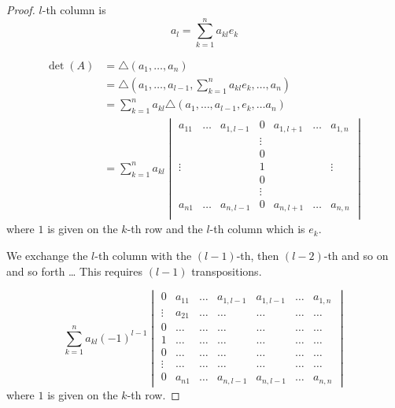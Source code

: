 \documentclass[a4paper,landscape,twocolumn]{article}
\theoremstyle{definition}
\begin{document}
\begin{proof}
  $l$-th column is
  \[ a_l = \sum_{k=1}^n a_{kl} e_{k} \]

  \begin{align*}
    \det(A) &= \triangle(a_1, \ldots, a_n) \\
      &= \triangle (a_1, \ldots, a_{l-1}, \sum_{k=1}^n a_{kl} e_k, \ldots, a_n) \\
      &= \sum_{k=1}^n a_{kl} \triangle (a_1, \ldots, a_{l-1}, e_k, \ldots a_n) \\
      &= \sum_{k=1}^n a_{kl}
        \begin{vmatrix}
          a_{11} & \ldots & a_{1,l-1} & 0 & a_{1,l+1} & \ldots & a_{1,n} \\
                 &        &           & \vdots &      &        & \\
                 &        &           & 0      &      &        & \\
          \vdots &        &           & 1      &      &        & \vdots \\
                 &        &           & 0      &      &        & \\
                 &        &           & \vdots &      &        & \\
          a_{n1} & \ldots & a_{n,l-1} & 0 & a_{n,l+1} & \ldots & a_{n,n} \\
        \end{vmatrix}
  \end{align*}
  where $1$ is given on the $k$-th row and the $l$-th column which is $e_k$.

  We exchange the $l$-th column with the $(l-1)$-th, then $(l-2)$-th and so on and so forth \dots
  This requires $(l-1)$ transpositions.

  \[
    \sum_{k=1}^n a_{kl} (-1)^{l-1}
    \begin{vmatrix}
      0 & a_{11} & \ldots & a_{1,l-1} & a_{1,l-1} & \ldots & a_{1,n} \\
      \vdots & a_{21} & \ldots & \ldots & \ldots & \ldots & \ldots \\
      0 & \ldots & \ldots & \ldots & \ldots & \ldots & \ldots \\
      1 & \ldots & \ldots & \ldots & \ldots & \ldots & \ldots \\
      0 & \ldots & \ldots & \ldots & \ldots & \ldots & \ldots \\
      \vdots & \ldots & \ldots & \ldots & \ldots & \ldots & \ldots \\
      0 & a_{n1} & \ldots & a_{n,l-1} & a_{n,l-1} & \ldots & a_{n,n}
    \end{vmatrix}
  \]
  where $1$ is given on the $k$-th row.


\end{proof}
\end{document}
